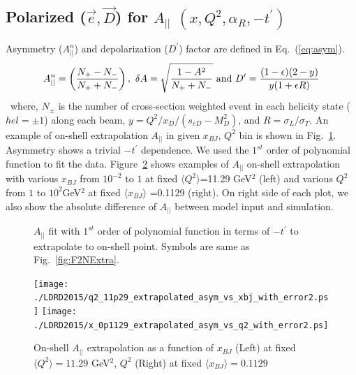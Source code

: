 \documentclass[12pt,letterpaper]{article}
\begin{document}
     

\subsection{Polarized ($\vec{e}, \vec{D}$) for $A_{||}$ $(x, Q^2, \alpha_R, -t^{\prime})$}

 Asymmetry ($A^n_{||}$) and depolarization ($D^{\prime}$) factor are defined in Eq.~(\ref{eq:asym}).
\begin{eqnarray}\label{eq:asym}
A^n_{||} = \left(\frac{N_+ - N_-}{N_+ + N_-}\right),~\delta A = \sqrt{\frac{1-A^2}{N_+ + N_-}}
~{\rm{and}}~D^{\prime} =\frac{(1-\epsilon)(2-y)}{y(1+\epsilon R)}
\end{eqnarray}
 ~where, $N_{\pm}$ is the number of cross-section weighted event in each helicity state ($hel=\pm1$) along each beam, $y = Q^2/x_D/(s_{eD}-M_D^2)$, and $R = \sigma_L/\sigma_T$. An example of on-shell extrapolation $A_{||}$ in given $x_{BJ}$, $Q^2$ bin is shown in Fig.~\ref{fig:A11Extra}. Asymmetry shows a trivial $-t^{\prime}$ dependence. We used the $1^{st}$ order of polynomial function to fit the data. 
Figure~\ref{fig:A11Extra2} shows examples of $A_{||}$ on-shell extrapolation with various $x_{BJ}$ from $10^{-2}$ to $1$ at fixed $\langle Q^2 \rangle$=11.29 GeV$^2$  (left) and various $Q^2$ from $1$ to $10^2$GeV$^2$ at fixed $\langle x_{BJ} \rangle$ =0.1129 (right). On right side of each plot, we also show the absolute difference of $A_{||}$ between model input and simulation.
\begin{figure}[htb]
  \begin{center} 
    \caption{$A_{||}$ fit with $1^{st}$ order of polynomial function in terms of $-t^{\prime}$ to extrapolate to on-shell point. Symbols are same as Fig.~\ref{fig:F2NExtra}.
      \label{fig:A11Extra}
    }
  \end{center} 
\end{figure}





\begin{figure}[htb]
  \hspace{-12mm}
  \texttt{[image: ./LDRD2015/q2\_11p29\_extrapolated\_asym\_vs\_xbj\_with\_error2.ps]}
  \texttt{[image: ./LDRD2015/x\_0p1129\_extrapolated\_asym\_vs\_q2\_with\_error2.ps]}
  \caption[On-shell $A_{||}$]{On-shell $A_{||}$ extrapolation as a function of $x_{BJ}$ (Left) at fixed $\langle Q^2 \rangle =11.29$ GeV$^2$, $Q^2$ (Right) at fixed $\langle x_{BJ} \rangle =0.1129$\label{fig:A11Extra2}}
\end{figure}
 
\end{document}
